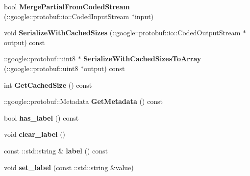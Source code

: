 \begin{DoxyCompactItemize}
\item 
\hypertarget{classgraph_1_1Graph_a3a08a0c8418c6317a890296c25f71b9e}{
bool {\bfseries MergePartialFromCodedStream} (::google::protobuf::io::CodedInputStream $\ast$input)}
\label{classgraph_1_1Graph_a3a08a0c8418c6317a890296c25f71b9e}

\item 
\hypertarget{classgraph_1_1Graph_a69559b8d11a32f5ebe89a0c86b936ed6}{
void {\bfseries SerializeWithCachedSizes} (::google::protobuf::io::CodedOutputStream $\ast$output) const }
\label{classgraph_1_1Graph_a69559b8d11a32f5ebe89a0c86b936ed6}

\item 
\hypertarget{classgraph_1_1Graph_add26e27feb424b498dc6e7c54250886b}{
::google::protobuf::uint8 $\ast$ {\bfseries SerializeWithCachedSizesToArray} (::google::protobuf::uint8 $\ast$output) const }
\label{classgraph_1_1Graph_add26e27feb424b498dc6e7c54250886b}

\item 
\hypertarget{classgraph_1_1Graph_a2a609292df58baec63cb473317334301}{
int {\bfseries GetCachedSize} () const }
\label{classgraph_1_1Graph_a2a609292df58baec63cb473317334301}

\item 
\hypertarget{classgraph_1_1Graph_aeafa7e8b0429a852055f80767941cb38}{
::google::protobuf::Metadata {\bfseries GetMetadata} () const }
\label{classgraph_1_1Graph_aeafa7e8b0429a852055f80767941cb38}

\item 
\hypertarget{classgraph_1_1Graph_a8a43e784467fb4eda053810d73725508}{
bool {\bfseries has\_\-label} () const }
\label{classgraph_1_1Graph_a8a43e784467fb4eda053810d73725508}

\item 
\hypertarget{classgraph_1_1Graph_ae493d41f9b434145be083cbc2044c1d9}{
void {\bfseries clear\_\-label} ()}
\label{classgraph_1_1Graph_ae493d41f9b434145be083cbc2044c1d9}

\item 
\hypertarget{classgraph_1_1Graph_aa6079fefaedc329a72194ed083c37413}{
const ::std::string \& {\bfseries label} () const }
\label{classgraph_1_1Graph_aa6079fefaedc329a72194ed083c37413}

\item 
\hypertarget{classgraph_1_1Graph_ab04d4c18c9ab77ee27d5e66b92624bdd}{
void {\bfseries set\_\-label} (const ::std::string \&value)}
\label{classgraph_1_1Graph_ab04d4c18c9ab77ee27d5e66b92624bdd}


\end{DoxyCompactItemize}

